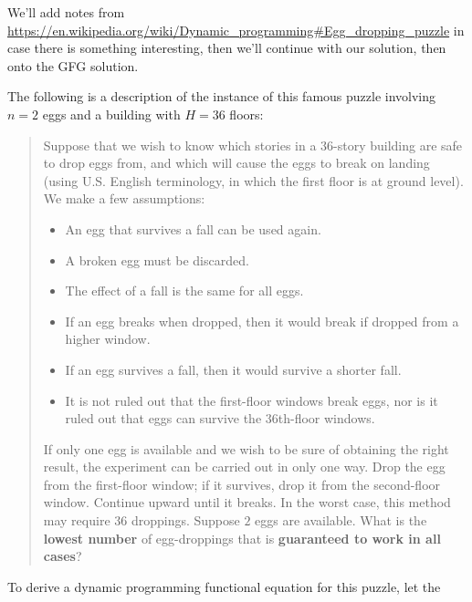 
\textbf{}

\RayNotesBegin

We'll add notes from
\url{https://en.wikipedia.org/wiki/Dynamic\_programming#Egg\_dropping\_puzzle}
in case there is something interesting, then we'll continue with our
solution, then onto the GFG solution.


The following is a description of the instance of this famous puzzle
involving $n=2$ eggs and a building with $H=36$ floors:
\begin{quotation}
Suppose that we wish to know which stories in a 36-story building are safe
to drop eggs from, and which will cause the eggs to break on landing (using
U.S. English terminology, in which the first floor is at ground level). We
make a few assumptions:
\begin{itemize}%
\item An egg that survives a fall can be used again.
\item A broken egg must be discarded.
\item The effect of a fall is the same for all eggs.
\item If an egg breaks when dropped, then it would break if dropped from a
  higher window.
\item If an egg survives a fall, then it would survive a shorter fall.
\item It is not ruled out that the first-floor windows break eggs, nor is it
  ruled out that eggs can survive the $36$th-floor windows.
\end{itemize}
If only one egg is available and we wish to be sure of obtaining the right
result, the experiment can be carried out in only one way. Drop the egg from
the first-floor window; if it survives, drop it from the second-floor
window. Continue upward until it breaks. In the worst case, this method may
require $36$ droppings. Suppose $2$ eggs are available. What is the
\textbf{lowest number} of egg-droppings that is \textbf{guaranteed to work
  in all cases}?
\end{quotation}
To derive a dynamic programming functional equation for this puzzle, let the
